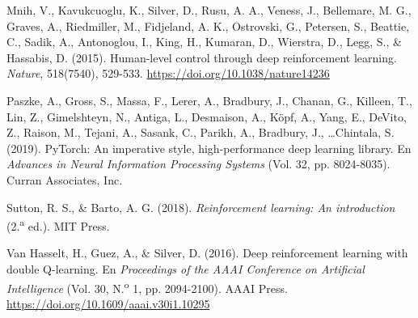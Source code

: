\documentclass[11pt,letterpaper]{article}
\begin{document}
\begin{trivlist}
\item Mnih, V., Kavukcuoglu, K., Silver, D., Rusu, A. A., Veness, J., Bellemare, M. G., Graves, A., Riedmiller, M., Fidjeland, A. K., Ostrovski, G., Petersen, S., Beattie, C., Sadik, A., Antonoglou, I., King, H., Kumaran, D., Wierstra, D., Legg, S., \& Hassabis, D. (2015). Human-level control through deep reinforcement learning. \textit{Nature}, 518(7540), 529-533. \url{https://doi.org/10.1038/nature14236}

\item Paszke, A., Gross, S., Massa, F., Lerer, A., Bradbury, J., Chanan, G., Killeen, T., Lin, Z., Gimelshteyn, N., Antiga, L., Desmaison, A., Köpf, A., Yang, E., DeVito, Z., Raison, M., Tejani, A., Sasank, C., Parikh, A., Bradbury, J., \dots Chintala, S. (2019). PyTorch: An imperative style, high-performance deep learning library. En \textit{Advances in Neural Information Processing Systems} (Vol. 32, pp. 8024-8035). Curran Associates, Inc.

\item Sutton, R. S., \& Barto, A. G. (2018). \textit{Reinforcement learning: An introduction} (2.\textsuperscript{a} ed.). MIT Press.

\item Van Hasselt, H., Guez, A., \& Silver, D. (2016). Deep reinforcement learning with double Q-learning. En \textit{Proceedings of the AAAI Conference on Artificial Intelligence} (Vol. 30, N.\textsuperscript{o} 1, pp. 2094-2100). AAAI Press. \url{https://doi.org/10.1609/aaai.v30i1.10295}

\end{trivlist}
\end{document}
